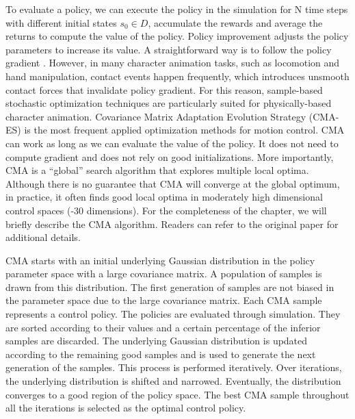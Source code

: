 To evaluate a policy, we can execute the policy in the simulation for N time steps with different initial states $s_0\in D$, accumulate the rewards and average the returns to compute the value of the policy. Policy improvement adjusts the policy parameters to increase its value. A straightforward way is to follow the policy gradient \cite{Ng:2000:PPS}. However, in many character animation tasks, such as locomotion and hand manipulation, contact events happen frequently, which introduces unsmooth contact forces that invalidate policy gradient. For this reason, sample-based stochastic optimization techniques are particularly suited for physically-based character animation. Covariance Matrix Adaptation Evolution Strategy (CMA-ES) \cite{hansen2006cma} is the most frequent applied optimization methods for motion control. CMA can work as long as we can evaluate the value of the policy. It does not need to compute gradient and does not rely on good initializations. More importantly, CMA is a ``global'' search algorithm that explores multiple local optima. Although there is no guarantee that CMA will converge at the global optimum, in practice, it often finds good local optima in moderately high dimensional control spaces (-30 dimensions). For the completeness of the chapter, we will briefly describe the CMA algorithm. Readers can refer to the original paper \cite{hansen2006cma} for additional details.

CMA starts with an initial underlying Gaussian distribution in the policy parameter space with a large covariance matrix. A population of samples is drawn from this distribution. The first generation of samples are not biased in the parameter space due to the large covariance matrix. Each CMA sample represents a control policy. The policies are evaluated through simulation. They are sorted according to their values and a certain percentage of the inferior samples are discarded. The underlying Gaussian distribution is updated according to the remaining good samples and is used to generate the next generation of the samples. This process is performed iteratively. Over iterations, the underlying distribution is shifted and narrowed. Eventually, the distribution converges to a good region of the policy space. The best CMA sample throughout all the iterations is selected as the optimal control policy.

